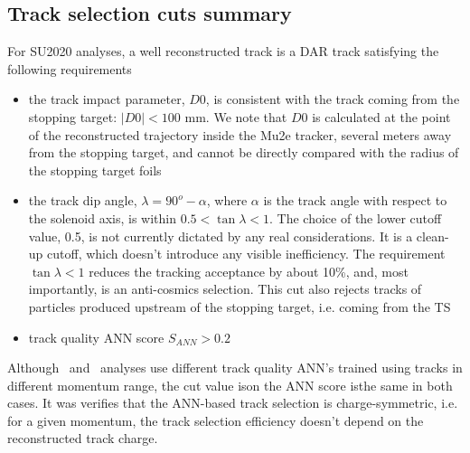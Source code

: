 \subsection{Track selection cuts summary}
\label{sec:track-selection_cuts_summary}
  
For SU2020 analyses, a well reconstructed track is a DAR track satisfying the following requirements

\begin{itemize}
\item
  the track impact parameter, $D0$, is consistent with the track coming from the stopping target: 
  $|D0| < 100$ mm. We note that $D0$ is calculated at the point of the reconstructed trajectory 
  inside the Mu2e tracker, several meters away from the stopping target, and cannot be 
  directly compared with the radius of the stopping target foils
\item 
  the track dip angle, $\lambda = 90^o - \alpha$, where $\alpha$ is the track angle with respect 
  to the solenoid axis, is within $ 0.5 < \tan{\lambda} < 1$. 
  The choice of the lower cutoff value, 0.5, is not currently dictated by any real considerations.
  It is a clean-up cutoff, which doesn't introduce any visible inefficiency. 
  The requirement $\tan{\lambda} < 1$ reduces the tracking acceptance by about 10\%, 
  and, most importantly, is an anti-cosmics selection. This cut also rejects tracks of particles 
  produced upstream of the stopping target, i.e. coming from the TS
\item
  track quality ANN score $S_{ANN} > 0.2$
\end{itemize}

Although \MuToEm\ and \MuToEp\ analyses use different track quality ANN's trained using tracks in different
momentum range, the cut value ison the ANN score isthe same in both cases.
It was verifies that the ANN-based track selection is charge-symmetric, i.e. for a given momentum,
the track selection efficiency doesn't depend on the reconstructed track charge.

